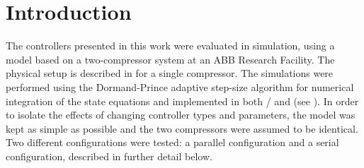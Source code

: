 \section{Introduction}

The controllers presented in this work were evaluated in simulation, using a model based on a two-compressor system at an ABB Research Facility. 
The physical setup is described in \cite{Cortinovis2015} for a single compressor.
The simulations were performed using the Dormand-Prince adaptive step-size algorithm for numerical integration of the state equations and implemented in both \mlab{}/\slink{} and \cpp{} (see ).
In order to isolate the effects of changing controller types and parameters, the model was kept as simple as possible and the two compressors were assumed to be identical.
Two different configurations were tested: a parallel configuration and a serial configuration, described in further detail below.


